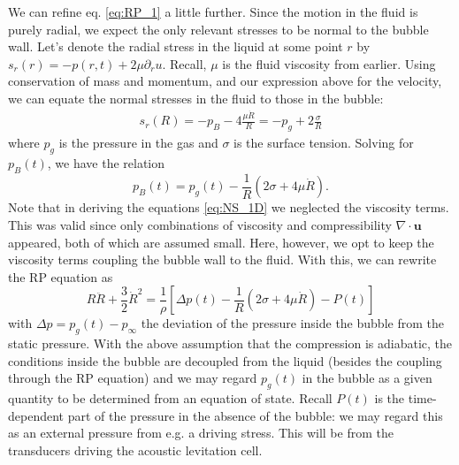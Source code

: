 \documentclass[rmp,aps,nofootinbib,superscriptaddress,floatfix]{revtex4-2}
\begin{document}
We can refine eq. \ref{eq:RP_1} a little further. Since the motion in the fluid is purely radial, we expect the only relevant stresses to be normal to the bubble wall. Let's denote the radial stress in the liquid at some point $r$ by $s_r(r)=-p(r,t)+2\mu \partial_r u$. Recall, $\mu$ is the fluid viscosity from earlier. Using conservation of mass and momentum, and our expression above for the velocity, we can equate the normal stresses in the fluid to those in the bubble:
\begin{equation}
\begin{split}
    s_r(R)=-p_B-4\frac{\mu \dot{R}}{R}=-p_g+2\frac{\sigma}{R}
\end{split}
\end{equation}
where $p_g$ is the pressure in the gas and $\sigma$ is the surface tension. Solving for $p_B(t)$, we have the relation \cite{brenner2002single,prosperetti1999old,prosperetti1986bubble}
\begin{equation}
    p_B(t)=p_g(t)-\frac{1}{R}\left( 2\sigma+4\mu \dot{R} \right)
    \label{eq:p_B}.
\end{equation}
Note that in deriving the equations \ref{eq:NS_1D} we neglected the viscosity terms. This was valid since only combinations of viscosity and compressibility $\nabla \cdot \bm{u}$ appeared, both of which are assumed small. Here, however, we opt to keep the viscosity terms coupling the bubble wall to the fluid. With this, we can rewrite the RP equation as 
\begin{equation}
    R\ddot{R}+\frac{3}{2}\dot{R}^2 = \frac{1}{\rho} \left[ \Delta p(t)-\frac{1}{R}\left( 2\sigma+4\mu \dot{R} \right)-P(t) \right]
    \label{eq:RP_2}
\end{equation}
with $\Delta p = p_g(t)-p_\infty$ the deviation of the pressure inside the bubble from the static pressure. With the above assumption that the compression is adiabatic, the conditions inside the bubble are decoupled from the liquid (besides the coupling through the RP equation) and we may regard $p_g(t)$ in the bubble as a given quantity to be determined from an equation of state. Recall $P(t)$ is the time-dependent part of the pressure in the absence of the bubble: we may regard this as an external pressure from e.g. a driving stress. This will be from the transducers driving the acoustic levitation cell.
\end{document}
